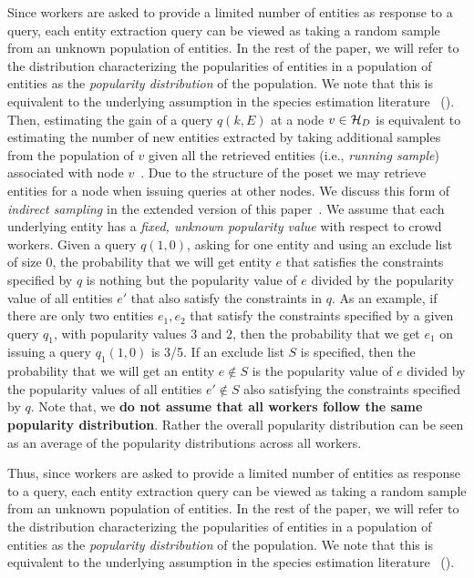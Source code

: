 Since workers are asked to provide a limited number of entities as response to a query, each entity extraction query can be viewed as taking a random sample from an unknown population of entities. In the rest of the paper, we will refer to the distribution characterizing the popularities of entities in a population of entities as the {\em popularity distribution} of the population. We note that this is equivalent to the underlying assumption in the species estimation literature~\cite{chao:1992} (). Then, estimating the gain of a query $q(k,E)$ at a node $v \in \mathcal{H}_D$ is equivalent to estimating the number of new entities extracted by taking additional samples from the population of $v$ given all the retrieved entities (i.e., {\em running sample}) associated with node $v$~\cite{trushkowsky:2013}. Due to the structure of the poset we may retrieve entities for a node when issuing queries at other nodes. We discuss this form of {\em indirect sampling} in the extended version of this paper~\cite{crowdgatherfull}. 
\fi
\iftr
{} We assume that each underlying entity has a {\em fixed, unknown popularity value} with respect to crowd workers. Given a query $q(1, 0)$, asking for one entity and using an exclude list of size $0$, the probability that we will get entity $e$ that satisfies the constraints specified by $q$ is nothing but the popularity value of $e$ divided by the popularity value of all entities $e'$ that also satisfy the constraints in $q$. As an example, if there are only two entities $e_1, e_2$ that satisfy the constraints specified by a given query $q_1$, with popularity values $3$ and $2$,
then the probability that we get $e_1$ on issuing a query $q_1(1, 0)$ is 3/5. 
If an exclude list $S$ is specified, then the probability that we will get an entity $e \notin S$ is the popularity value of $e$ divided by the popularity values of all entities $e' \notin S$ also satisfying the constraints specified by $q$. Note that, we {\bf do not assume that all workers follow the same popularity distribution}. Rather the overall popularity distribution can be seen as an average of the popularity distributions across all workers.

Thus, since workers are asked to provide a limited number of entities as response to a query, each entity extraction query can be viewed as taking a random sample from an unknown population of entities. In the rest of the paper, we will refer to the distribution characterizing the popularities of entities in a population of entities as the {\em popularity distribution} of the population. We note that this is equivalent to the underlying assumption in the species estimation literature~\cite{chao:1992} ().


